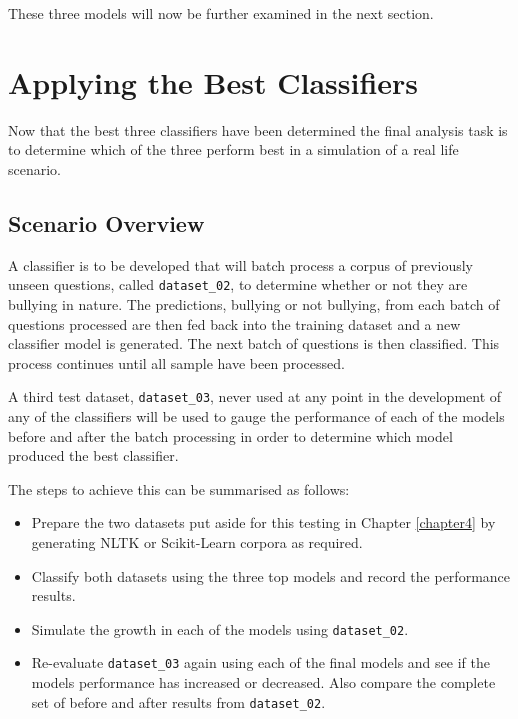 These three models will now be further examined in the next section.

\section{Applying the Best Classifiers}
\label{subsection:applying-classifiers_app}

Now that the best three classifiers have been determined the final analysis task is to determine which of the three perform best in a simulation of a real life scenario. 

\subsection{Scenario Overview}
A classifier is to be developed that will batch process a corpus of previously unseen questions, called \verb|dataset_02|, to determine whether or not they are bullying in nature. The predictions, bullying or not bullying, from each batch of questions processed are then fed back into the training dataset and a new classifier model is generated. The next batch of questions is then classified. This process continues until all sample have been processed. 

A third test dataset, \verb|dataset_03|, never used at any point in the development of any of the classifiers will be used to gauge the performance of each of the models before and after the batch processing in order to determine which model produced the best classifier.

The steps to achieve this can be summarised as follows:

\begin{itemize}

	\item Prepare the two datasets put aside for this testing in Chapter \ref{chapter4} by generating NLTK or Scikit-Learn corpora as required.
	\item Classify both datasets using the three top models and record the performance results.
	\item Simulate the growth in each of the models using \verb|dataset_02|.
	\item Re-evaluate \verb|dataset_03| again using each of the final models and see if the models performance has increased or decreased. Also compare the complete set of before and after results from \verb|dataset_02|.

\end{itemize}

